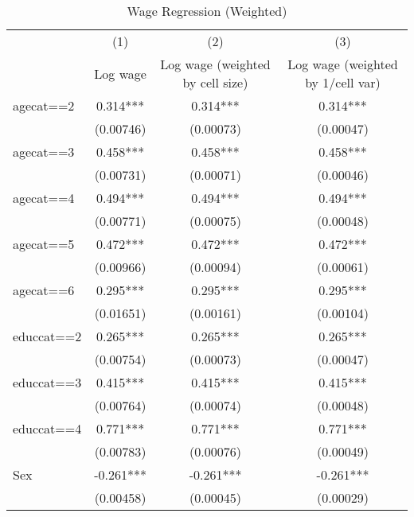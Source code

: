 \begin{table}[htbp]\centering
\def\sym#1{\ifmmode^{#1}\else\(^{#1}\)\fi}
\caption{Wage Regression (Weighted)}
\begin{tabular}{l*{3}{c}}
\toprule
                    &\multicolumn{1}{c}{(1)}&\multicolumn{1}{c}{(2)}&\multicolumn{1}{c}{(3)}\\
                    &\multicolumn{1}{c}{Log wage}&\multicolumn{1}{c}{Log wage (weighted by cell size)}&\multicolumn{1}{c}{Log wage (weighted by 1/cell var)}\\
\midrule
agecat==2           &       0.314***&       0.314***&       0.314***\\
                    &   (0.00746)   &   (0.00073)   &   (0.00047)   \\
\addlinespace
agecat==3           &       0.458***&       0.458***&       0.458***\\
                    &   (0.00731)   &   (0.00071)   &   (0.00046)   \\
\addlinespace
agecat==4           &       0.494***&       0.494***&       0.494***\\
                    &   (0.00771)   &   (0.00075)   &   (0.00048)   \\
\addlinespace
agecat==5           &       0.472***&       0.472***&       0.472***\\
                    &   (0.00966)   &   (0.00094)   &   (0.00061)   \\
\addlinespace
agecat==6           &       0.295***&       0.295***&       0.295***\\
                    &   (0.01651)   &   (0.00161)   &   (0.00104)   \\
\addlinespace
educcat==2          &       0.265***&       0.265***&       0.265***\\
                    &   (0.00754)   &   (0.00073)   &   (0.00047)   \\
\addlinespace
educcat==3          &       0.415***&       0.415***&       0.415***\\
                    &   (0.00764)   &   (0.00074)   &   (0.00048)   \\
\addlinespace
educcat==4          &       0.771***&       0.771***&       0.771***\\
                    &   (0.00783)   &   (0.00076)   &   (0.00049)   \\
\addlinespace
Sex                 &      -0.261***&      -0.261***&      -0.261***\\
                    &   (0.00458)   &   (0.00045)   &   (0.00029)   \\

\end{tabular}
\end{table}
